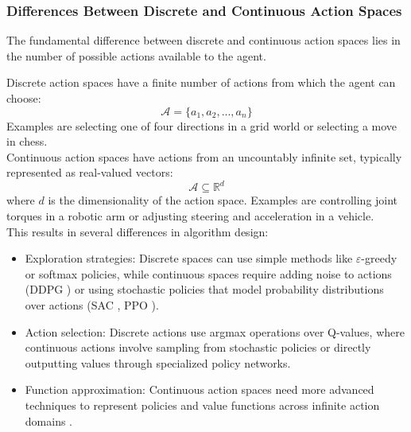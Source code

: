 \subsubsection{Differences Between Discrete and Continuous Action Spaces}

The fundamental difference between discrete and continuous action spaces lies in the number of possible actions available to the agent.

\noindent Discrete action spaces have a finite number of actions from which the agent can choose:
\begin{equation}
    \mathcal{A} = \{a_1, a_2, ..., a_n\}
\end{equation}
Examples are selecting one of four directions in a grid world or selecting a move in chess.\\
\noindent Continuous action spaces have actions from an uncountably infinite set, typically represented as real-valued vectors:
\begin{equation}
\mathcal{A} \subseteq \mathbb{R}^d
\end{equation}
where $d$ is the dimensionality of the action space. Examples are controlling joint torques in a robotic arm or adjusting steering and acceleration in a vehicle.\\

\noindent This results in several differences in algorithm design:

\begin{itemize}
    \item Exploration strategies:  Discrete spaces can use simple methods like  $\varepsilon$-greedy or softmax policies, while continuous spaces require adding noise to actions (\gls{DDPG} \cite{lillicrap2019continuouscontroldeepreinforcement}) or using stochastic policies that model probability distributions over actions (\gls{SAC} \cite{haarnoja2018softactorcriticoffpolicymaximum}, \gls{PPO} \cite{schulman2017proximalpolicyoptimizationalgorithms}).
    \item Action selection: Discrete actions use argmax operations over Q-values, where continuous actions involve sampling from stochastic policies or directly outputting values through specialized policy networks.
    \item Function approximation: Continuous action spaces need more advanced techniques to represent policies and value functions across infinite action domains \cite{fujimoto2018addressingfunctionapproximationerror}.
\end{itemize}

